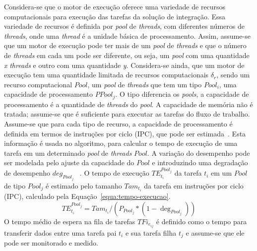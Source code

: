 Considera-se que o motor de execução oferece uma variedade de recursos computacionais para execução das tarefas da solução de integração. Essa variedade de recursos é definida por \emph{pool} de \emph{threads}, com diferentes números de \emph{threads}, onde uma \emph{thread} é a unidade básica de processamento. Assim, assume-se que um motor de execução pode ter mais de um \emph{pool} de \emph{threads} e que o número de \emph{threads} em cada um pode ser diferente, ou seja, um \emph{pool} com uma quantidade \textit{x} \emph{threads} e outro com uma quantidade \textit{y}. Considera-se ainda, que um motor de execução tem uma quantidade limitada de recursos computacionais ${\delta _r}$, sendo um recurso computacional $Pool$, um \emph{pool} de \emph{threads} que tem um tipo $Pool _i$, uma capacidade de processamento $PPool_j$. O tipo diferencia os \emph{pools}, a capacidade de processamento é a quantidade de \emph{threads} do \emph{pool}. A capacidade de memória não é tratada; assume-se que é suficiente para executar as tarefas do fluxo de trabalho. Assume-se que para cada tipo de recurso, a capacidade de processamento é definida em termos de instruções por ciclo (IPC), que pode ser estimada~\cite{abraham2016runtime}. Esta informação é usada no algoritmo, para calcular o tempo de execução de uma tarefa em um determinado \emph{pool} de \emph{threads} $Pool$. A variação do desempenho pode ser modelada pelo ajuste da capacidade do $Pool$ e introduzindo uma degradação de desempenho $deg_{Pool_{j}}$ ~\cite{rodriguez2014}. 
O tempo de execução $TE_{{t_i}}^{Poo{l_j}}$ da tarefa $t_i$ em um $Pool$ de tipo $Pool_j$ é estimado pelo tamanho $Ta{m_{{t_i}}}$ da tarefa em instruções por ciclo (IPC), calculado pela Equação~\ref{equa:tempo-execucao}. 
\begin{equation}
TE_{{t_i}}^{Pool_{j}} = Ta{m_{{t_i}}}/({P_{Pool_{j}}}*(1 - {\deg _{Pool_{j}}}))
\label{equa:tempo-execucao}
\end{equation}
%
%
%
O tempo médio de espera na fila de tarefas $TF{i_{e_{ij}}}$ é definido como o tempo para transferir dados entre uma tarefa pai $t_i$ e sua tarefa filha $t_j$ e assume-se que ele pode ser monitorado e medido.  

